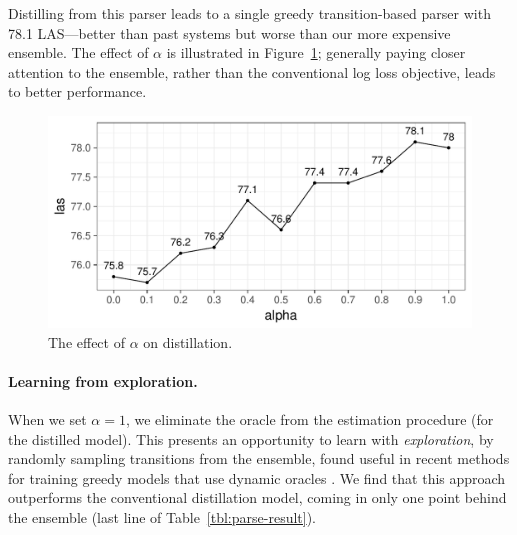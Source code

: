 \documentclass[11pt,a4paper]{article}
\begin{document}
Distilling from this 
parser leads to a single greedy transition-based parser with 78.1
LAS---better than past systems but worse than our more expensive ensemble.
The effect of $\alpha$ is illustrated in
Figure~\ref{fig:effect-alpha}; generally paying closer attention to
the ensemble, rather than the conventional log loss objective, leads
to better performance.

\begin{figure}[t]
	\centering
	\includegraphics[width=\columnwidth,trim={0.3cm 0 0 0},clip]{graphics/alpha}
	\caption{The effect of $\alpha$ on distillation. \label{fig:effect-alpha}}
\end{figure}

\paragraph{Learning from exploration.} When we set $\alpha =1$, we
eliminate the oracle from the estimation procedure (for the distilled
model).  This presents an opportunity to learn with \emph{exploration}, by
randomly sampling transitions from the ensemble, found useful
in recent methods for training greedy models that use dynamic oracles
\citep{ballesteros-EtAl:2016:EMNLP2016}.  
We find that this
approach outperforms the  conventional distillation model, coming in
only one point behind the ensemble (last line of Table~\ref{tbl:parse-result}).

%
\end{document}
